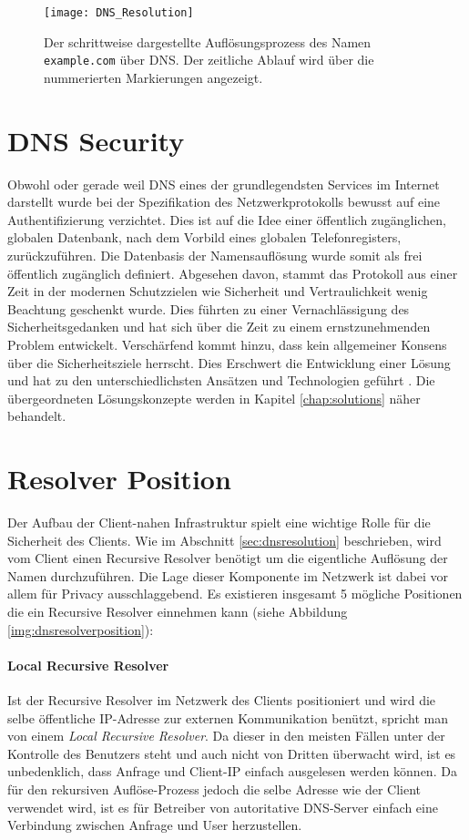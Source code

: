 \begin{figure}[htbp]
    \centering
    \texttt{[image: DNS\_Resolution]}
    \caption{Der schrittweise dargestellte Auflösungsprozess des Namen \texttt{example.com} über DNS. Der zeitliche Ablauf wird über die nummerierten Markierungen angezeigt.}
    \label{img:dnsresolution}
\end{figure}

\section{DNS Security}
\label{sec:dnssecurity}

Obwohl oder gerade weil DNS eines der grundlegendsten Services im Internet darstellt wurde bei der Spezifikation des Netzwerkprotokolls bewusst auf eine Authentifizierung verzichtet. Dies ist auf die Idee einer öffentlich zugänglichen, globalen Datenbank, nach dem Vorbild eines globalen Telefonregisters, zurückzuführen. Die Datenbasis der Namensauflösung wurde somit als frei öffentlich zugänglich definiert. Abgesehen davon, stammt das Protokoll aus einer Zeit in der modernen Schutzzielen wie Sicherheit und Vertraulichkeit wenig Beachtung geschenkt wurde. Dies führten zu einer Vernachlässigung des Sicherheitsgedanken und hat sich über die Zeit zu einem ernstzunehmenden Problem entwickelt. Verschärfend kommt hinzu, dass kein allgemeiner Konsens über die Sicherheitsziele herrscht. Dies Erschwert die Entwicklung einer Lösung und hat zu den unterschiedlichsten Ansätzen und Technologien geführt \cite{Grothoff2018}. Die übergeordneten Lösungskonzepte werden in Kapitel \ref{chap:solutions} näher behandelt.

\section{Resolver Position}
\label{sec:dnsresolverposition}
Der Aufbau der Client-nahen Infrastruktur spielt eine wichtige Rolle für die Sicherheit des Clients. Wie im Abschnitt \ref{sec:dnsresolution} beschrieben, wird vom Client einen Recursive Resolver benötigt um die eigentliche Auflösung der Namen durchzuführen. Die Lage dieser Komponente im Netzwerk ist dabei vor allem für Privacy ausschlaggebend. Es existieren insgesamt 5 mögliche Positionen die ein Recursive Resolver einnehmen kann\cite{VanHeugten2018} (siehe Abbildung \ref{img:dnsresolverposition}):

\paragraph{Local Recursive Resolver}
Ist der Recursive Resolver im Netzwerk des Clients positioniert und wird die selbe öffentliche IP-Adresse zur externen Kommunikation benützt, spricht man von einem \textit{Local Recursive Resolver}. Da dieser in den meisten Fällen unter der Kontrolle des Benutzers steht und auch nicht von Dritten überwacht wird, ist es unbedenklich, dass Anfrage und Client-IP einfach ausgelesen werden können. Da für den rekursiven Auflöse-Prozess jedoch die selbe Adresse wie der Client verwendet wird, ist es für Betreiber von autoritative DNS-Server einfach eine Verbindung zwischen Anfrage und User herzustellen.  


